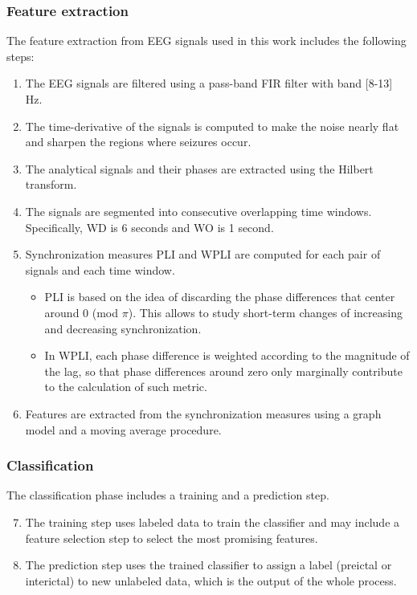 \subsubsection{Feature extraction}
The feature extraction from \gls{EEG} signals used in this work includes the following steps:
\begin{enumerate}
    \item The EEG signals are filtered using a pass-band FIR filter with band [8-13] \unit{Hz}.
    \item The time-derivative of the signals is computed to make the noise nearly flat and sharpen the regions where seizures occur.
    \item The analytical signals and their phases are extracted using the Hilbert transform.
    \item The signals are segmented into consecutive overlapping time windows. 
    Specifically, \gls{WD} is 6 seconds and \gls{WO} is 1 second.
    \item Synchronization measures \gls{PLI} and \gls{WPLI} are computed for each pair of signals and each time window.
        \begin{itemize}
            \item \gls{PLI} is based on the idea of discarding the phase differences that center around 0 (mod $\pi$). This allows to study short-term changes of increasing and decreasing synchronization.
            \item In \gls{WPLI}, each phase difference is weighted according to the magnitude of the lag, so that phase differences around zero only marginally contribute to the calculation of such metric.
        \end{itemize}
    \item Features are extracted from the synchronization measures using a graph model and a moving average procedure.
\end{enumerate}

\subsubsection{Classification}
The classification phase includes a training and a prediction step. 
\begin{enumerate}
    \setcounter{enumi}{6}
    \item The training step uses labeled data to train the classifier and may include a feature selection step to select the most promising features.
    \item The prediction step uses the trained classifier to assign a label (preictal or interictal) to new unlabeled data, which is the output of the whole process.
\end{enumerate}

